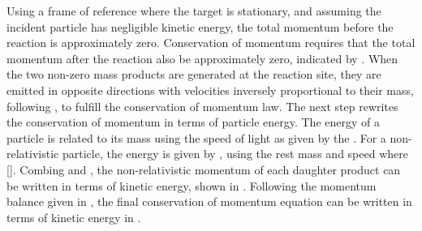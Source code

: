 \documentclass[../../../../main.tex]{subfiles}
\begin{document}
    Using a frame of reference where the target  is stationary, and assuming the incident particle  has negligible kinetic energy, the total momentum before the reaction is approximately zero.
    Conservation of momentum requires that the total momentum after the reaction also be approximately zero, indicated by .
    When the two non-zero mass products are generated at the reaction site, they are emitted in opposite directions with velocities inversely proportional to their mass, following , to fulfill the conservation of momentum law.
    The next step rewrites the conservation of momentum in terms of particle energy.
    The energy  of a particle is related to its mass  using the speed of light  as given by the .
    For a non-relativistic particle, the energy is given by , using the rest mass  and speed  where [].
    Combing  and , the non-relativistic momentum of each daughter product can be written in terms of kinetic energy, shown in .
    Following the momentum balance given in , the final conservation of momentum equation can be written in terms of kinetic energy in .
\end{document}
